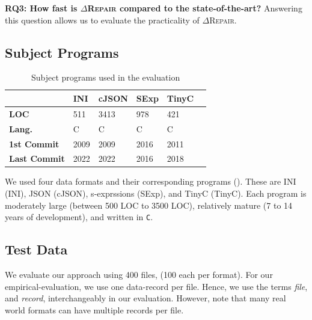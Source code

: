 \documentclass[sigconf,review,anonymous]{acmart}
\newcommand{\approach}{\textsc{$\Delta$Repair}\xspace}
\newcommand{\drepair}{\approach}
\def\<#1>{\texttt{#1}}
\begin{document}
\noindent\textbf{RQ3: How fast is \drepair compared to the state-of-the-art?}
Answering this question allows us to evaluate the practicality of \drepair.


\subsection{Subject Programs} %
\begin{table}[!tbp]\centering
  \footnotesize
\caption{Subject programs used in the evaluation}
\begin{tabular}{|p{3cm}|p{1cm}|p{1cm}|p{1cm}|p{1cm}|p{1cm}}
\hline
\textbf{} & \textbf{INI} & \textbf{cJSON} & \textbf{SExp} & \textbf{TinyC} \\
\hline
\textbf{LOC} & 511 & 3413 & 978 & 421\\
\textbf{Lang.} & C & C & C & C \\
\textbf{1st Commit} & 2009 & 2009 & 2016 & 2011\\
\textbf{Last Commit} & 2022 & 2022 & 2016 & 2018\\
\hline
\end{tabular}
\label{tab:subjectprograms}
\end{table}

We used four data formats and their corresponding programs
().
These are INI (INI), JSON (cJSON), s-exprssions (SExp), and TinyC (TinyC).
Each program is moderately large (between 500 LOC to 3500 LOC), relatively
mature (7 to 14 years of development), and written in \<C>.

\subsection{Test Data} 

We evaluate our approach using 400 files, (100 each per format).
For our empirical-evaluation, we use one data-record per file. Hence, we use
the terms \emph{file}, and \emph{record}, interchangeably in our evaluation.
However, note that many real world formats can have multiple records per file.
\end{document}
